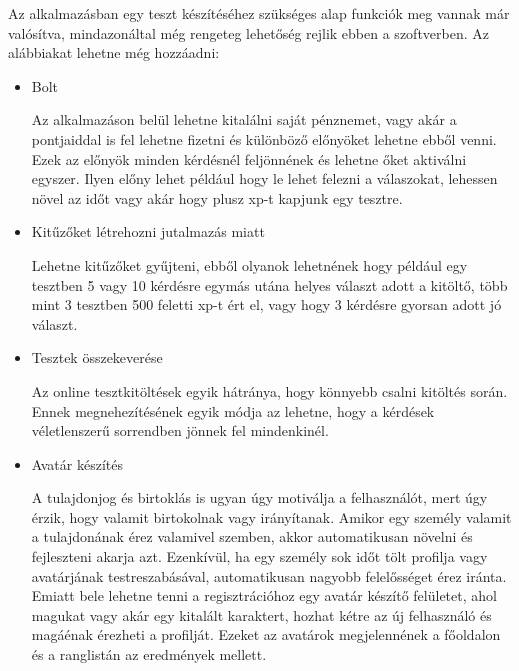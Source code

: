 


Az alkalmazásban egy teszt készítéséhez szükséges alap funkciók meg vannak már valósítva, mindazonáltal még rengeteg lehetőség rejlik ebben a szoftverben. Az alábbiakat lehetne még hozzáadni:

\begin{itemize}
    \item {Bolt}
          \begin{addmargin}[\parindent]{0pt}
              Az alkalmazáson belül lehetne kitalálni saját pénznemet, vagy akár a pontjaiddal is fel lehetne fizetni és különböző előnyöket lehetne ebből venni. Ezek az előnyök minden kérdésnél feljönnének és lehetne őket aktiválni egyszer. Ilyen előny lehet például hogy le lehet felezni a válaszokat, lehessen növel az időt vagy akár hogy plusz xp-t kapjunk egy tesztre.
          \end{addmargin}
    \item {Kitűzőket létrehozni jutalmazás miatt}
          \begin{addmargin}[\parindent]{0pt}
              Lehetne kitűzőket gyűjteni, ebből olyanok lehetnének hogy például egy tesztben 5 vagy 10 kérdésre egymás utána helyes választ adott a kitöltő, több mint 3 tesztben 500 feletti xp-t ért el, vagy hogy 3 kérdésre gyorsan adott jó választ.
          \end{addmargin}
    \item {Tesztek összekeverése}
          \begin{addmargin}[\parindent]{0pt}
              Az online tesztkitöltések egyik hátránya, hogy könnyebb csalni kitöltés során. Ennek megnehezítésének egyik módja az lehetne, hogy a kérdések véletlenszerű sorrendben jönnek fel mindenkinél.
          \end{addmargin}
    \item {Avatár készítés}
          \begin{addmargin}[\parindent]{0pt}
              A tulajdonjog és birtoklás is ugyan úgy motiválja a felhasználót, mert úgy érzik, hogy valamit birtokolnak vagy irányítanak. Amikor egy személy valamit a tulajdonának érez valamivel szemben, akkor automatikusan növelni és fejleszteni akarja azt. Ezenkívül, ha egy személy sok időt tölt profilja vagy avatárjának testreszabásával, automatikusan nagyobb felelősséget érez iránta. Emiatt bele lehetne tenni a regisztrációhoz egy avatár készítő felületet, ahol magukat vagy akár egy kitalált karaktert, hozhat kétre az új felhasználó és magáénak érezheti a profilját. Ezeket az avatárok megjelennének a főoldalon és a ranglistán az eredmények mellett.

\end{addmargin}
\end{itemize}
